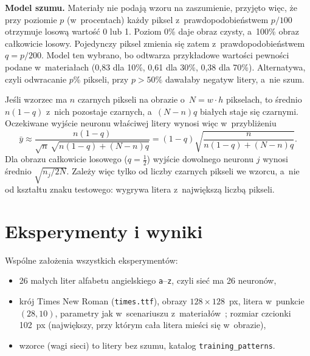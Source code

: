 \documentclass[12pt]{article}
\begin{document}
\textbf{Model szumu.} Materiały nie podają wzoru na zaszumienie, przyjęto więc,
że przy poziomie $p$ (w~procentach) każdy piksel z~prawdopodobieństwem $p/100$
otrzymuje losową wartość 0 lub 1. Poziom 0\% daje obraz czysty, a~100\% obraz
całkowicie losowy. Pojedynczy piksel zmienia się zatem z~prawdopodobieństwem
$q = p/200$. Model ten wybrano, bo odtwarza przykładowe wartości pewności podane
w~materiałach (0,83 dla 10\%, 0,61 dla 30\%, 0,38 dla 70\%). Alternatywa, czyli
odwracanie $p$\% pikseli, przy $p>50\%$ dawałaby negatyw litery, a~nie szum.

Jeśli wzorzec ma $n$ czarnych pikseli na obrazie o~$N=w\cdot h$ pikselach,
to średnio $n(1-q)$ z~nich pozostaje czarnych, a~$(N-n)q$ białych staje się
czarnymi. Oczekiwane wyjście neuronu właściwej litery wynosi więc w~przybliżeniu
\begin{equation}
 \bar{y} \approx \frac{n(1-q)}{\sqrt{n}\,\sqrt{n(1-q)+(N-n)q}}
 = (1-q)\sqrt{\frac{n}{n(1-q)+(N-n)q}} .
 \label{eq_theory}
\end{equation}
Dla obrazu całkowicie losowego ($q=\tfrac12$) wyjście dowolnego neuronu $j$ wynosi
średnio $\sqrt{n_j/2N}$. Zależy więc tylko od liczby czarnych pikseli we wzorcu, a~nie
od kształtu znaku testowego: wygrywa litera z~największą liczbą pikseli.

\section{Eksperymenty i wyniki}

Wspólne założenia wszystkich eksperymentów:
\begin{itemize}
 \item 26 małych liter alfabetu angielskiego \texttt{a}--\texttt{z}, czyli sieć ma 26 neuronów,
 \item krój Times New Roman (\texttt{times.ttf}), obrazy $128\times128$~px, litera w~punkcie $(28,10)$,
       parametry jak w~scenariuszu z~materiałów~\cite{wyklad2}; rozmiar czcionki 102~px
       (największy, przy którym cała litera mieści się w~obrazie),
 \item wzorce (wagi sieci) to litery bez szumu, katalog \texttt{training\_patterns}.
\end{itemize}

\end{document}
